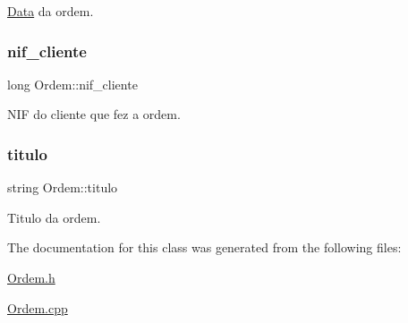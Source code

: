 \hyperlink{class_data}{Data} da ordem. 

\hypertarget{class_ordem_af6d06b4250735ae531bdcef5fa332f02}{}\label{class_ordem_af6d06b4250735ae531bdcef5fa332f02} 
\subsubsection{\texorpdfstring{nif\+\_\+cliente}{nif\_cliente}}
{\footnotesize\ttfamily long Ordem\+::nif\+\_\+cliente\hspace{0.3cm}{\ttfamily [protected]}}



N\+IF do cliente que fez a ordem. 

\hypertarget{class_ordem_a0773861bd9fb956d5ec62f2ef1de658b}{}\label{class_ordem_a0773861bd9fb956d5ec62f2ef1de658b} 
\subsubsection{\texorpdfstring{titulo}{titulo}}
{\footnotesize\ttfamily string Ordem\+::titulo\hspace{0.3cm}{\ttfamily [protected]}}



Titulo da ordem. 



The documentation for this class was generated from the following files\+:\begin{DoxyCompactItemize}
\item 
\hyperlink{_ordem_8h}{Ordem.\+h}\item 
\hyperlink{_ordem_8cpp}{Ordem.\+cpp}\end{DoxyCompactItemize}
